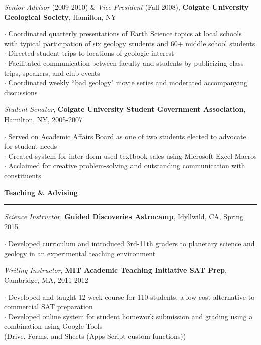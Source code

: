 \documentclass[11pt]{article}
\begin{document}
\emph{Senior Advisor} (2009-2010) \& \emph{Vice-President} (Fall 2008), \textbf{Colgate University Geological Society}, Hamilton, NY \\
\begin{small}$\cdot$ {Coordinated quarterly presentations of Earth Science topics at local schools with typical participation of six geology students and 60+ \hspace*{1 mm} middle school students} \\
$\cdot$ {Directed student trips to locations of geologic interest } \\
$\cdot$ {Facilitated communication between faculty and students by publicizing class trips, speakers, and club events } \\
$\cdot$ {Coordinated weekly ``bad geology" movie series and moderated accompanying discussions}\end{small}

\emph{Student Senator}, \textbf{Colgate University Student Government Association}, Hamilton, NY, 2005-2007  \\
\begin{small}$\cdot$ {Served on Academic Affairs Board as one of two students elected to advocate for student needs }\\
$\cdot$ {Created system for inter-dorm used textbook sales using Microsoft Excel Macros }\\
$\cdot$ {Acclaimed for creative problem-solving and outstanding communication with constituents }\end{small}

\vspace*{0.25 mm}
\textbf{Teaching \& Advising}
\smallskip
\hrule
\emph{Science Instructor}, \textbf{Guided Discoveries Astrocamp}, Idyllwild, CA, Spring 2015\\
\begin{small}$\cdot$ {Developed curriculum and introduced 3rd-11th graders to planetary science and geology in an experimental teaching environment}\end{small}

\emph{Writing Instructor}, \textbf{MIT Academic Teaching Initiative SAT Prep}, Cambridge, MA, 2011-2012\\
\begin{small}$\cdot$ {Developed and taught 12-week course for 110 students, a low-cost alternative to commercial SAT preparation}\\
$\cdot$ {Developed online system for student homework submission and grading using a combination using Google Tools \\ 
\hspace*{5 mm}(Drive, Forms, and Sheets (Apps Script custom functions))}\end{small}
\end{document}
